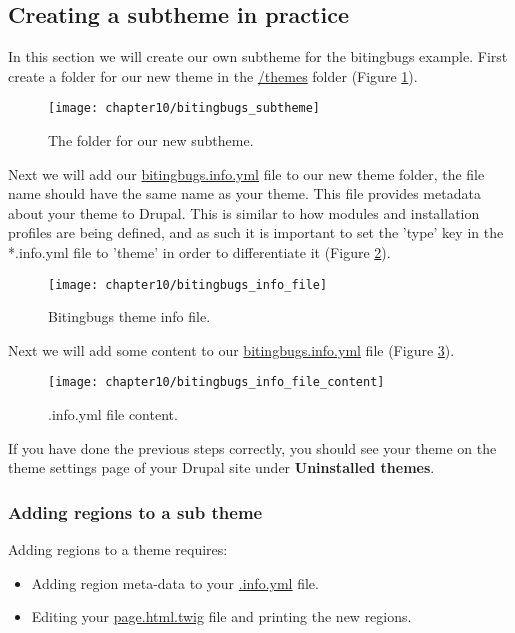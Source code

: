 \subsection{Creating a subtheme in practice}

In this section we will create our own subtheme for the bitingbugs example. First create a folder for our new theme in the \url{/themes} folder (Figure \ref{fig:bitingbugs_subtheme}). 

\begin{figure}[H]
	\centering
	\texttt{[image: chapter10/bitingbugs\_subtheme]}
	\caption{The folder for our new subtheme.}
	\label{fig:bitingbugs_subtheme}
\end{figure}

Next we will add our \url{bitingbugs.info.yml} file to our new theme folder, the file name should have the same name as your theme. This file provides meta­data about your theme to Drupal. This is similar to how modules and installation profiles are being defined, and as such it is important to set the 'type' key in the *.info.yml file to 'theme' in order to differentiate it (Figure \ref{fig:bitingbugs_info_file}).

\begin{figure}[H]
	\centering
	\texttt{[image: chapter10/bitingbugs\_info\_file]}
	\caption{Bitingbugs theme info file.}
	\label{fig:bitingbugs_info_file}
\end{figure}

Next we will add some content to our \url{bitingbugs.info.yml} file (Figure \ref{fig:bitingbugs_info_file_content}).

\begin{figure}[H]
	\centering
	\texttt{[image: chapter10/bitingbugs\_info\_file\_content]}
	\caption{.info.yml file content.}
	\label{fig:bitingbugs_info_file_content}
\end{figure}

If you have done the previous steps correctly, you should see your theme on the theme settings page of your Drupal site under \textbf{Uninstalled themes}. 

\subsubsection{Adding regions to a sub theme}

Adding regions to a theme requires:
\begin{itemize}
	\item Adding region meta-data to your \url{.info.yml} file.
	\item Editing your \url{page.html.twig} file and printing the new regions.
\end{itemize}

